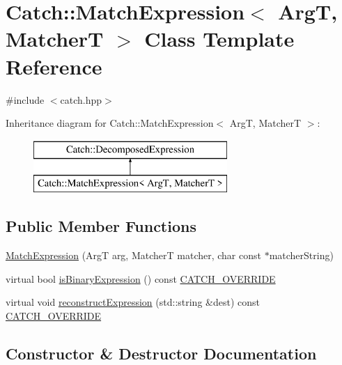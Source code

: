 \hypertarget{class_catch_1_1_match_expression}{}\section{Catch\+:\+:Match\+Expression$<$ ArgT, MatcherT $>$ Class Template Reference}
\label{class_catch_1_1_match_expression}


{\ttfamily \#include $<$catch.\+hpp$>$}

Inheritance diagram for Catch\+:\+:Match\+Expression$<$ ArgT, MatcherT $>$\+:\begin{figure}[H]
\begin{center}
\leavevmode
\includegraphics[height=2.000000cm]{class_catch_1_1_match_expression}
\end{center}
\end{figure}
\subsection*{Public Member Functions}
\begin{DoxyCompactItemize}
\item 
\mbox{\hyperlink{class_catch_1_1_match_expression_a506f25bad7970cb35f9dbe54763a8ca5}{Match\+Expression}} (ArgT arg, MatcherT matcher, char const $\ast$matcher\+String)
\item 
virtual bool \mbox{\hyperlink{class_catch_1_1_match_expression_ac4edf6e9a6e5762a487db1486d0d1f45}{is\+Binary\+Expression}} () const \mbox{\hyperlink{catch_8hpp_a8ecdce4d3f57835f707915ae831eb847}{C\+A\+T\+C\+H\+\_\+\+O\+V\+E\+R\+R\+I\+DE}}
\item 
virtual void \mbox{\hyperlink{class_catch_1_1_match_expression_a4410a93bc5b8241eb2502f400fce7ec4}{reconstruct\+Expression}} (std\+::string \&dest) const \mbox{\hyperlink{catch_8hpp_a8ecdce4d3f57835f707915ae831eb847}{C\+A\+T\+C\+H\+\_\+\+O\+V\+E\+R\+R\+I\+DE}}
\end{DoxyCompactItemize}


\subsection{Constructor \& Destructor Documentation}
\mbox{\label{class_catch_1_1_match_expression_a506f25bad7970cb35f9dbe54763a8ca5}} 
